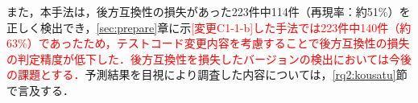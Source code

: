 \documentclass[submit]{ipsj}
\begin{document}
{また，本手法は，後方互換性の損失があった223件中114件（再現率：約51\%）を正しく検出でき，\ref{sec:prepare}章に示\textcolor{red}{[変更C1-1-b]した手法では223件中140件（約63\%）であったため，テストコード変更内容を考慮することで後方互換性の損失の判定精度が低下した．後方互換性を損失したバージョンの検出においては今後の課題とする．}予測結果を目視により調査した内容については，\ref{rq2:kousatu}節で言及する．









}
\end{document}
